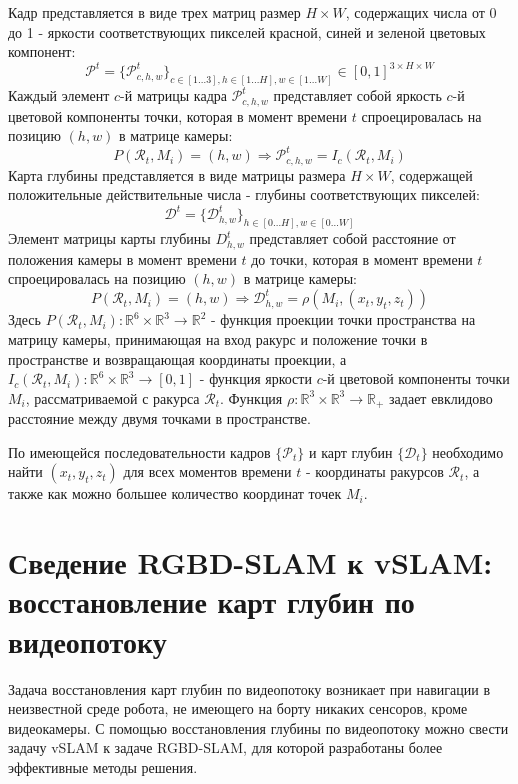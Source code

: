 \documentclass{mipt-thesis-ms}
\begin{document}
	Кадр представляется в виде трех матриц размер $H \times W$, содержащих числа от 0 до 1 - яркости соответствующих пикселей красной, синей и зеленой цветовых компонент:
	$$\mathcal{P}^t = \{\mathcal{P}^t_{c,h,w}\}_{c \in [1 \dots 3], h \in [1 \dots H], w \in [1 \dots W]} \in [0, 1]^{3 \times H \times W}$$
	Каждый элемент $c$-й матрицы кадра $\mathcal{P}^t_{c,h,w}$ представляет собой яркость $c$-й цветовой компоненты точки, которая в момент времени $t$ спроецировалась на позицию $(h, w)$ в матрице камеры:
	$$P(\mathcal{R}_t, M_i) = (h, w) \Rightarrow \mathcal{P}^t_{c,h,w} = I_c(\mathcal{R}_t, M_i)$$
	Карта глубины представляется в виде матрицы размера $H \times W$, содержащей положительные действительные числа - глубины соответствующих пикселей:
	$$\mathcal{D}^t = \{\mathcal{D}^t_{h,w}\}_{h \in [0 \dots H], w \in [0 \dots W]}$$
	Элемент матрицы карты глубины $D^t_{h,w}$ представляет собой расстояние от положения камеры в момент времени $t$ до точки, которая в момент времени $t$ спроецировалась на позицию $(h, w)$ в матрице камеры: 
	$$P(\mathcal{R}_t, M_i) = (h, w) \Rightarrow \mathcal{D}^t_{h,w} = \rho(M_i, (x_t, y_t, z_t))$$
	Здесь $P(\mathcal{R}_t, M_i): \mathbb{R}^6 \times \mathbb{R}^3 \rightarrow \mathbb{R}^2$ - функция проекции точки пространства на матрицу камеры, принимающая на вход ракурс и положение точки в пространстве и возвращающая координаты проекции, а $I_c (\mathcal{R}_t, M_i): \mathbb{R}^6 \times \mathbb{R}^3 \rightarrow [0, 1]$ - функция яркости $c$-й цветовой компоненты точки $M_i$, рассматриваемой с ракурса $\mathcal{R}_t$. Функция $\rho: \mathbb{R}^3 \times \mathbb{R}^3 \rightarrow \mathbb{R}_{+}$ задает евклидово расстояние между двумя точками в пространстве.
	
	По имеющейся последовательности кадров $\{\mathcal{P}_t\}$ и карт глубин $\{\mathcal{D}_t\}$ необходимо найти $(x_t, y_t, z_t)$ для всех моментов времени $t$ - координаты ракурсов $\mathcal{R}_t$, а также как можно большее количество координат точек $M_i$.
	
	\section{Сведение RGBD-SLAM к vSLAM: восстановление карт глубин по видеопотоку}
	
	Задача восстановления карт глубин по видеопотоку возникает при навигации в неизвестной среде робота, не имеющего на борту никаких сенсоров, кроме видеокамеры. С помощью восстановления глубины по видеопотоку можно свести задачу vSLAM к задаче RGBD-SLAM, для которой разработаны более эффективные методы решения.
	
\end{document}
